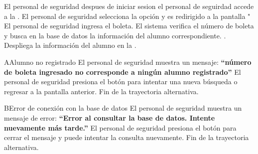 \begin{UCtrayectoria}
	\UCpaso[\UCactor] El personal de seguridad despues de iniciar sesion el personal de seguirdad accede a la .
	\UCpaso[\UCactor] El personal de seguridad selecciona la opción  y es redirigido a la pantalla "
	\UCpaso[\UCactor] El personal de seguridad ingresa el boleta.
	\UCpaso El sistema verifica el número de boleta y busca en la base de datos la información del alumno correspondiente. .
	\UCpaso Despliega la información del alumno en la .
\end{UCtrayectoria}
\begin{UCtrayectoriaA}{A}{Alumno no registrado}
	\UCpaso[\UCactor] El personal de seguridad muestra un mensaje: {\bf ``número de boleta ingresado no corresponde a ningún alumno registrado''}
	\UCpaso[\UCactor] El personal de seguridad presiona el botón  para intentar una nueva búsqueda o regresar a la pantalla anterior.
	\UCpaso Fin de la trayectoria alternativa.
\end{UCtrayectoriaA}

\begin{UCtrayectoriaA}{B}{Error de conexión con la base de datos}
	\UCpaso[\UCactor] El personal de seguridad muestra un mensaje de error: {\bf ``Error al consultar la base de datos. Intente nuevamente más tarde.''}
	\UCpaso[\UCactor] El personal de seguridad presiona el botón  para cerrar el mensaje y puede intentar la consulta nuevamente.
	\UCpaso Fin de la trayectoria alternativa.
\end{UCtrayectoriaA}

